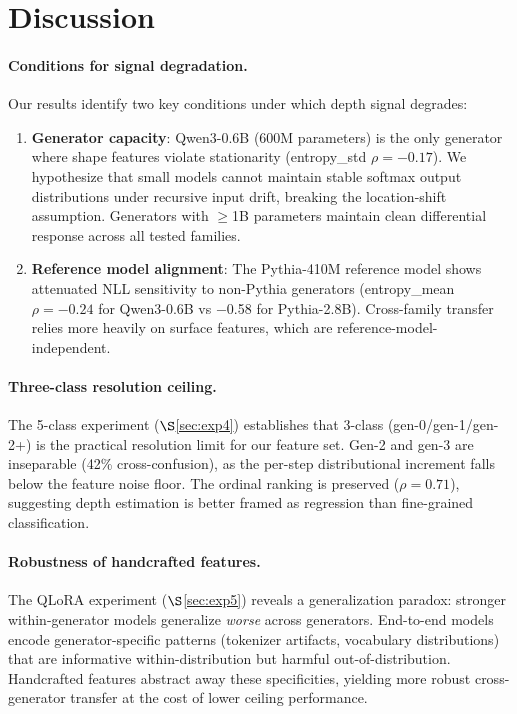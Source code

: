 \documentclass[11pt,a4paper]{article}
\begin{document}
\section{Discussion}

\paragraph{Conditions for signal degradation.} Our results identify two key conditions under which depth signal degrades:
\begin{enumerate}
    \item \textbf{Generator capacity}: Qwen3-0.6B (600M parameters) is the only generator where shape features violate stationarity (entropy\_std $\rho{=}{-}0.17$). We hypothesize that small models cannot maintain stable softmax output distributions under recursive input drift, breaking the location-shift assumption. Generators with ${\geq}$1B parameters maintain clean differential response across all tested families.
    \item \textbf{Reference model alignment}: The Pythia-410M reference model shows attenuated NLL sensitivity to non-Pythia generators (entropy\_mean $\rho{=}{-}0.24$ for Qwen3-0.6B vs $-$0.58 for Pythia-2.8B). Cross-family transfer relies more heavily on surface features, which are reference-model-independent.
\end{enumerate}

\paragraph{Three-class resolution ceiling.} The 5-class experiment ($\S$\ref{sec:exp4}) establishes that 3-class (gen-0/gen-1/gen-2+) is the practical resolution limit for our feature set. Gen-2 and gen-3 are inseparable (42\% cross-confusion), as the per-step distributional increment falls below the feature noise floor. The ordinal ranking is preserved ($\rho{=}0.71$), suggesting depth estimation is better framed as regression than fine-grained classification.

\paragraph{Robustness of handcrafted features.} The QLoRA experiment ($\S$\ref{sec:exp5}) reveals a generalization paradox: stronger within-generator models generalize \emph{worse} across generators. End-to-end models encode generator-specific patterns (tokenizer artifacts, vocabulary distributions) that are informative within-distribution but harmful out-of-distribution. Handcrafted features abstract away these specificities, yielding more robust cross-generator transfer at the cost of lower ceiling performance.
\end{document}
